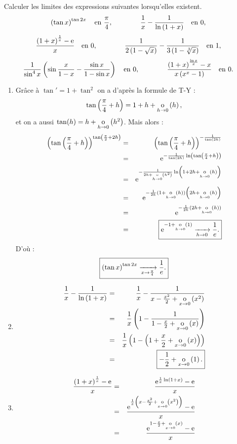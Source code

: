 \documentclass{magnolia}
\begin{document}
Calculer les limites des expressions suivantes lorsqu'elles existent.
\[\left(\tan x\right)^{\tan 2x} \quad \text{en $\frac{\pi}{4}$}, \qquad\qquad
  \frac{1}{x}-\frac{1}{\ln\left(1+x\right)} \quad \text{en 0},\]
\[\frac{\left(1+x\right)^{\frac{1}{x}}-{\rm e}}{x} \quad \text{en 0}, \qquad\qquad
  \frac{1}{2\left(1-\sqrt{x}\right)}-\frac{1}{3\left(1-\sqrt[3]{x}\right)} \quad \text{en 1},\]
\[\frac{1}{\sin^4 x}\left(\sin\frac{x}{1-x}-\frac{\sin x}{1-\sin x}\right)
  \quad\text{en 0}, \qquad\qquad
  \frac{\left(1+x\right)^{\frac{\ln x}{x}}-x}{x\left(x^x-1\right)} \quad \text{en 0}.\]
\begin{sol}
\begin{enumerate}
\item Grâce à $\tan'=1+\tan^2$ on a d'après la formule de T-Y :
$$\tan\left(\frac{\pi}{4}+h\right)=1+h+\underset{h \rightarrow 0}{\text{o}}\left(h\right),$$
et on a aussi $\tan(h)=h+\underset{h \rightarrow 0}{\text{o}}\left(h^2\right)$.
Mais alors :
\begin{eqnarray*}
\left(\tan\left(\frac{\pi}{4}+h\right)\right)^{\tan\left(\frac{\pi}{2}+2h\right)}&=&\left(\tan\left(\frac{\pi}{4}+h\right)\right)^{-\frac{1}{\tan(2h)}}\\
&=&{\rm e}^{-\frac{1}{\tan(2h)}\ln\left(\tan\left(\frac{\pi}{4}+h\right)\right)}\\
&=&{\rm e}^{-\frac{1}{2h+\underset{h \rightarrow 0}{\text{o}}\left(h^2\right)}\ln\left(1+2h+\underset{h \rightarrow 0}{\text{o}}\left(h\right)\right)}\\
&=&{\rm e}^{-\frac{1}{2h}(1+\underset{h \rightarrow 0}{\text{o}}\left(h\right))\left(2h+\underset{h \rightarrow 0}{\text{o}}\left(h\right)\right)}\\
&=&{\rm e}^{-\frac{1}{2h}(2h+\underset{h \rightarrow 0}{\text{o}}\left(h\right))}\\
&=&\boxed{{\rm e}^{-1+\underset{h \rightarrow 0}{\text{o}}\left(1\right)}\xrightarrow[h\rightarrow 0]{}{\frac{1}{e}}.}
\end{eqnarray*}
D'où :
\[\boxed{\left(\tan x\right)^{\tan 2x}\xrightarrow[x\rightarrow \frac{\pi}{4}]{}\frac{1}{e}.}\]
\item \begin{eqnarray*}
\frac{1}{x}-\frac{1}{\ln\left(1+x\right)}&=&\frac{1}{x}-\frac{1}{x-\frac{x^2}{2}+\underset{x \rightarrow 0}{\text{o}}\left(x^2\right)}\\
&=&\frac{1}{x}\left(1-\frac{1}{1-\frac{x}{2}+\underset{x \rightarrow 0}{\text{o}}\left(x\right)}\right)\\
&=&\frac{1}{x}\left(1-\left(1+\frac{x}{2}+\underset{x \rightarrow 0}{\text{o}}\left(x\right)\right)\right)\\
&=&\boxed{-\dfrac12+\underset{x \rightarrow 0}{\text{o}}\left(1\right).}
\end{eqnarray*}
\item 
\begin{eqnarray*}
\frac{\p{1+x}^{\frac{1}{x}}-\e}{x}&=&\frac{\e^{\frac{1}{x}\ln(1+x)}-\e}{x}\\
&=&\frac{\e^{\frac{1}{x}\p{x-\frac{x^2}{2}+\petitozero{x}{x^2}}}-\e}{x}\\
&=&\frac{\e^{1-\frac{x}{2}+\petitozero{x}{x}}-\e}{x}\\

\end{eqnarray*}
\end{enumerate}
\end{sol}
\end{document}
